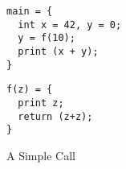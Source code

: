 \label{sec:running-example}

\begin{figure}[b]
    \begin{minipage}{.3\textwidth}
\begin{verbatim}
main = {
  int x = 42, y = 0;
  y = f(10);
  print (x + y);
}
\end{verbatim}
    \end{minipage}
    \begin{minipage}{.3\textwidth}
\begin{verbatim}
f(z) = {
  print z;
  return (z+z);
}
\end{verbatim}
    \end{minipage}
\caption{A Simple Call}
\label{fig:simple-program}
\end{figure}


\newcommand*{\add}{\textsc{add}}
\newcommand*{\addi}{\textsc{addi}}
\newcommand*{\sw}{\textsc{sw}}
\newcommand*{\lw}{\textsc{lw}}
\newcommand*{\jal}{\textsc{jal}}
\newcommand*{\jalr}{\textsc{jalr}}
\newcommand*{\rra}{\textsc{ra}}
\newcommand*{\rout}{\textsc{out}}

\newcommand*{\tagInstr}{\textsc{instr}}
\newcommand*{\tagCall}{\textsc{call}}
\newcommand*{\tagHa}{\textsc{h1}}
\newcommand*{\tagHb}{\textsc{h2}}
\newcommand*{\tagRa}{\textsc{r1}}
\newcommand*{\tagRb}{\textsc{r2}}
\newcommand*{\tagRc}{\textsc{r3}}
\newcommand*{\tagNoDepth}{\textsc{unused}}
\newcommand*{\tagStackDepth}[1]{\textsc{stack} ~ #1}
\newcommand*{\tagPCDepth}[1]{\textsc{pc} ~ #1}
\newcommand*{\tagSP}{\textsc{sp}}

\setcounter{pcctr}{0}
\newcommand*{\row}[4]{
  \thepcctr & \stepcounter{pcctr} #2 & #3 & \text{#4}\\
}
\newcommand*{\tracerow}[5]{
  #1 & #2 & #3 & #4 & \text{#5}\\
}
\newcommand*{\summary}[6]{
\[
\begin{array}{cccccc}
  \PCname = #1 & r_0 = #2 & \rra = #3 & \rsp = #4 & r_4 = #5 & r_5 = #6
\end{array}
\]
}
\newcommand{\negate}{\textrm{-}}


\newcommand{\instrc}{lgray}
\newcommand{\mainsealc}{cyan}
\newcommand{\fsealc}{green}
\newcommand{\unsealc}{gray}
\newcommand{\emptyoutc}{white} %
\newcommand{\fulloutc}{white}


